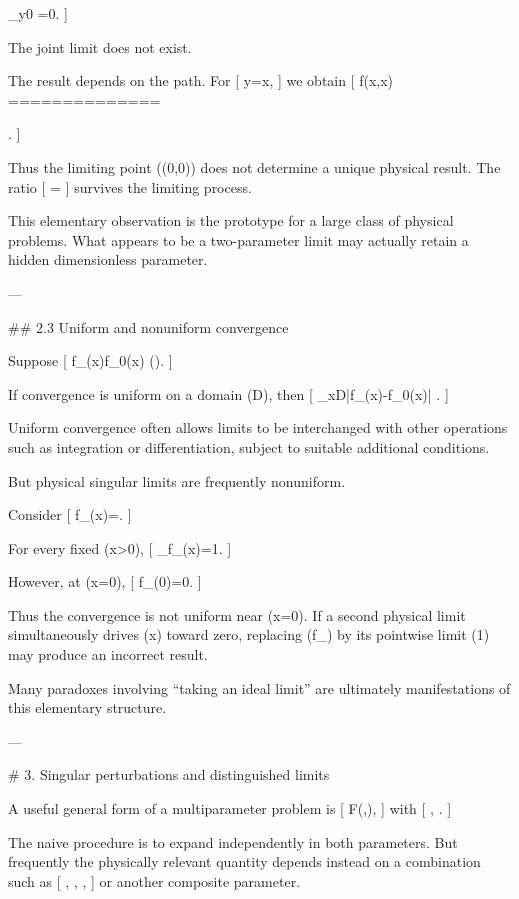 \lim_{y}0
=0.
]

The joint limit does not exist.

The result depends on the path. For
[
y=\lambda x,
]
we obtain
[
f(x,\lambda x)
==============

.
]

Thus the limiting point ((0,0)) does not determine a unique physical result. The ratio
[
\lambda=
]
survives the limiting process.

This elementary observation is the prototype for a large class of physical problems. What appears to be a two-parameter limit may actually retain a hidden dimensionless parameter.

---

## 2.3 Uniform and nonuniform convergence

Suppose
[
f_\epsilon(x)\rightarrow f_0(x)
\qquad
(\epsilon{}).
]

If convergence is uniform on a domain (D), then
[
\sup_{x\in D}|f_\epsilon(x)-f_0(x)|
.
]

Uniform convergence often allows limits to be interchanged with other operations such as integration or differentiation, subject to suitable additional conditions.

But physical singular limits are frequently nonuniform.

Consider
[
f_\epsilon(x)=.
]

For every fixed (x>0),
[
\lim_{\epsilon{}}f_\epsilon(x)=1.
]

However, at (x=0),
[
f_\epsilon(0)=0.
]

Thus the convergence is not uniform near (x=0). If a second physical limit simultaneously drives (x) toward zero, replacing (f_\epsilon) by its pointwise limit (1) may produce an incorrect result.

Many paradoxes involving ``taking an ideal limit'' are ultimately manifestations of this elementary structure.

---

# 3. Singular perturbations and distinguished limits

A useful general form of a multiparameter problem is
[
F(\epsilon,\delta),
]
with
[
\epsilon{},
\qquad
\delta{}.
]

The naive procedure is to expand independently in both parameters. But frequently the physically relevant quantity depends instead on a combination such as
[
\frac{\delta}{\epsilon},
\qquad
{},
\qquad
\epsilon\log\delta,
]
or another composite parameter.

